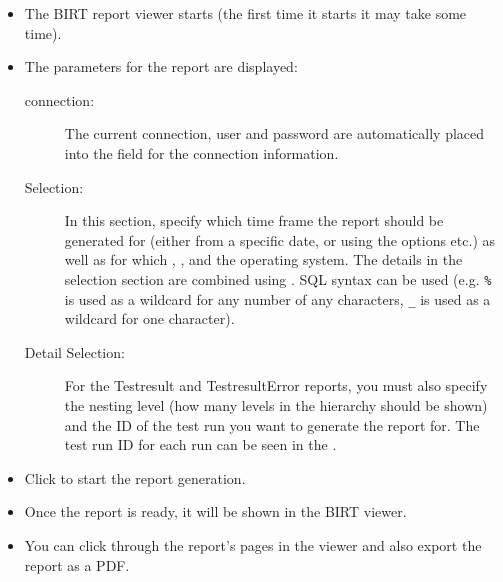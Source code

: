 \begin{itemize}
\item The BIRT report viewer starts (the first time it starts it may take some time).
\item The parameters for the report are displayed:
\begin{description}
\item [\gddb{} connection:]{The current \gddb{} connection, user and password are automatically placed into the field for the connection information.}
\item [Selection:]{In this section, specify which time frame the report should be generated for (either from a specific date, or using the options  etc.) as well as for which \gdproject{}, \gdsuite{}, and the operating system.  The details in the selection section are combined using . SQL syntax can be used (e.g. \verb+%+ is used as a wildcard for any number of any characters, \verb+_+ is used as a wildcard for one character). }
\item [Detail Selection:]{For the Testresult and TestresultError reports, you must also specify the nesting level (how many levels in the hierarchy should be shown) and the ID of the test run you want to generate the report for. The test run ID for each run can be seen in the \gdtestsummaryview{}.}
\end{description}

\item Click  to start the report generation. 
\item Once the report is ready, it will be shown in the BIRT viewer. 
\item You can click through the report's pages in the viewer and also export the report as a PDF. 

\end{itemize}
